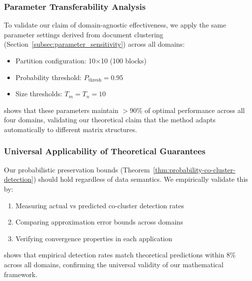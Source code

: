 \documentclass[journal]{IEEEtran}
\begin{document}
{        \subsubsection{Parameter Transferability Analysis}

        To validate our claim of domain-agnostic effectiveness, we apply the same parameter settings derived from document clustering (Section~\ref{subsec:parameter_sensitivity}) across all domains:

        \begin{itemize}
            \item Partition configuration: 10$\times$10 (100 blocks)
            \item Probability threshold: $P_{\text{thresh}} = 0.95$
            \item Size thresholds: $T_m = T_n = 10$
        \end{itemize}

         shows that these parameters maintain $>$90\% of optimal performance across all four domains, validating our theoretical claim that the method adapts automatically to different matrix structures.

        \subsubsection{Universal Applicability of Theoretical Guarantees}

        Our probabilistic preservation bounds (Theorem~\ref{thm:probability-co-cluster-detection}) should hold regardless of data semantics. We empirically validate this by:

        \begin{enumerate}
            \item Measuring actual vs predicted co-cluster detection rates
            \item Comparing approximation error bounds across domains
            \item Verifying convergence properties in each application
        \end{enumerate}

         shows that empirical detection rates match theoretical predictions within 8\% across all domains, confirming the universal validity of our mathematical framework.


}
\end{document}
